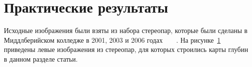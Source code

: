 \documentclass{ConfFTI}
\begin{document}
\section{Практические результаты}

Исходные изображения были взяты из набора стереопар,
которые были сделаны в Миддлберийском колледже в 2001, 2003 и 2006
годах~\cite{middlebury:ds:2001}~\cite{middlebury:ds:2003}~\cite{middlebury:ds:2006:1}~\cite{middlebury:ds:2006:2}.
На рисунке~\ref{fig:stereopair:left} приведены левые изображения из стереопар,
для которых строились карты глубин в данном разделе статьи.

\begin{figure}[h!]
    \centering
     \qquad
     \qquad
    \label{fig:stereopair:left}
\end{figure}
\end{document}
